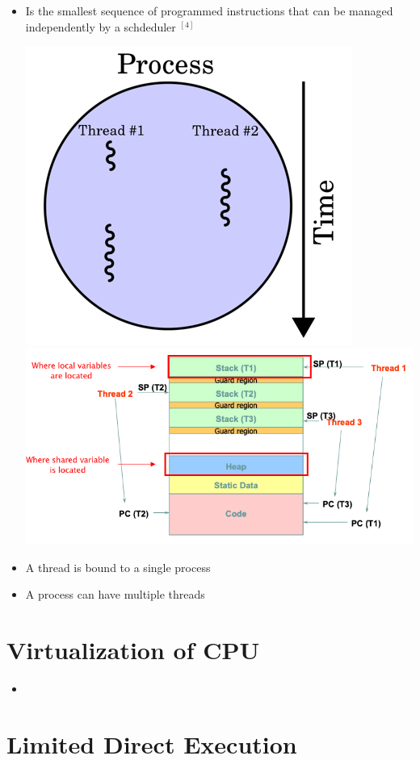 \documentclass[12pt]{article}
\begin{document}
\begin{itemize}
    \item Is the smallest sequence of programmed instructions that can be managed independently
    by a schdeduler $^{[4]}$

    \begin{center}
    \includegraphics[width=0.4\linewidth]{images/midterm_1_solution_6.png}
    \includegraphics[width=\linewidth]{images/midterm_1_solution_7.png}
    \end{center}

    \item A thread is bound to a single process
    \item A process can have multiple threads
\end{itemize}

\section*{Virtualization of CPU}

\begin{itemize}
    \item
\end{itemize}
\section*{Limited Direct Execution}
\end{document}
